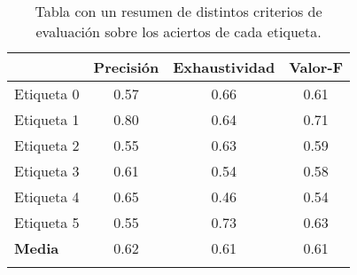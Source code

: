 \begin{table}[htp]
\caption{Tabla con un resumen de distintos criterios de evaluación sobre los aciertos de cada etiqueta.}
\label{tab:report}
\centering
\begin{tabular}{l c c c}

\toprule
	&	\textbf{Precisión}	&	\textbf{Exhaustividad}		& \textbf{Valor-F} \\
\midrule
Etiqueta 0		&	0.57	&	0.66	&	0.61			\\
Etiqueta 1		&	0.80	&	0.64	&	0.71		\\
Etiqueta 2		&	0.55	&	0.63	&	0.59		\\
Etiqueta 3		&	0.61	&	0.54	&	0.58		\\
Etiqueta 4		&	0.65	&	0.46	&	0.54		\\
Etiqueta 5		&	0.55	&	0.73	&	0.63		\\
\midrule
\textbf{Media}		&	0.62	&	0.61	&	0.61		\\
\bottomrule\\
\end{tabular}
\end{table}

